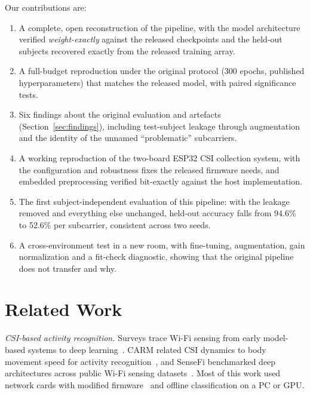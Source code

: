 \documentclass[journal]{IEEEtran}
\begin{document}
Our contributions are:
\begin{enumerate}
\item A complete, open reconstruction of the pipeline, with the model architecture
      verified \emph{weight-exactly} against the released checkpoints and the
      held-out subjects recovered exactly from the released training array.
\item A full-budget reproduction under the original protocol (300 epochs, published
      hyperparameters) that matches the released model, with paired significance
      tests.
\item Six findings about the original evaluation and artefacts
      (Section~\ref{sec:findings}), including test-subject leakage through
      augmentation and the identity of the unnamed ``problematic'' subcarriers.
\item A working reproduction of the two-board ESP32 CSI collection system, with the
      configuration and robustness fixes the released firmware needs, and embedded
      preprocessing verified bit-exactly against the host implementation.
\item The first subject-independent evaluation of this pipeline: with the leakage
      removed and everything else unchanged, held-out accuracy falls from 94.6\% to
      52.6\% per subcarrier, consistent across two seeds.
\item A cross-environment test in a new room, with fine-tuning, augmentation, gain
      normalization and a fit-check diagnostic, showing that the original pipeline
      does not transfer and why.
\end{enumerate}

\section{Related Work}
\label{sec:related}

\emph{CSI-based activity recognition.} Surveys trace Wi-Fi sensing from early
model-based systems to deep learning~\cite{ma2019survey,miao2025survey}. CARM related
CSI dynamics to body movement speed for activity recognition~\cite{wang2015carm}, and
SenseFi benchmarked deep architectures across public Wi-Fi sensing
datasets~\cite{yang2023sensefi}. Most of this work used network cards with modified
firmware~\cite{halperin2011tool} and offline classification on a PC or GPU.
\end{document}
